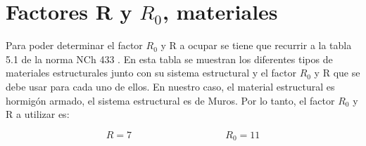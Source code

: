 \section{Factores \textbf{R} y \textbf{$R_0$}, materiales}

Para poder determinar el factor $R_0$ y R a ocupar se tiene que recurrir a la tabla 5.1 de la norma NCh 433 \cite{NCh433:1996}. En esta tabla se muestran los diferentes tipos de materiales estructurales junto con su sistema estructural y el factor $R_0$ y R que se debe usar para cada uno de ellos. En nuestro caso, el material estructural es hormigón armado, el sistema estructural es de Muros. Por lo tanto, el factor $R_0$ y R a utilizar es:

$$ R=7 \hspace{4cm} R_0 = 11$$


